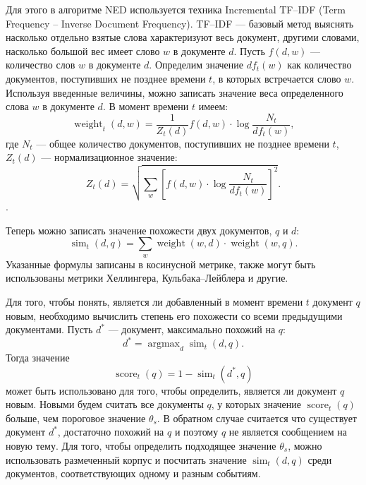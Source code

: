 \documentclass[12pt, a4paper]{article}
\DeclareMathOperator*{\argmax}{argmax}
\DeclareMathOperator{\weight}{weight}
\DeclareMathOperator{\score}{score}
\DeclareMathOperator{\simu}{sim}
\begin{document}
	Для этого в алгоритме NED используется техника Incremental TF--IDF (Term Frequency -- Inverse Document Frequency). TF--IDF --- базовый метод выяснять насколько отдельно взятые слова характеризуют весь документ, другими словами, насколько большой вес имеет слово $w$ в документе $d$. Пусть $f(d,w)$ --- количество слов $w$ в документе $d$. Определим значение $df_t(w)$ как количество документов, поступивших не позднее времени $t$, в которых встречается слово $w$. Используя введенные величины, можно записать значение веса определенного слова $w$ в документе $d$. В момент времени $t$ имеем:
	\begin{equation}
	\weight_t(d,w) = \frac{1}{Z_t(d)}f(d,w) \cdot \log \frac{N_t}{df_t(w)},
	\end{equation}
	где $N_t$ --- общее количество документов, поступивших не позднее времени $t$, $Z_t(d)$ --- нормализационное значение:
	\begin{equation}
	Z_t(d) = \sqrt{\sum_w \left[ f(d,w) \cdot \log \frac{N_t}{df_t(w)} \right]^2}.
	\end{equation}.
	
	Теперь можно записать значение похожести двух документов, $q$ и $d$:
	\begin{equation}
	\simu_t(d,q) = \sum_w \weight(w, d) \cdot \weight(w, q).
	\end{equation}
	Указанные формулы записаны в косинусной метрике, также могут быть использованы метрики Хеллингера, Кульбака--Лейблера и другие.
	
	Для того, чтобы понять, является ли добавленный в момент времени $t$ документ $q$ новым, необходимо вычислить степень его похожести со всеми предыдущими документами. Пусть $d^*$ --- документ, максимально похожий на $q$:
	\begin{equation}
	d^* = \argmax_d \simu_t (d,q).
	\end{equation}
	Тогда значение
	\begin{equation}
	\score_t(q) = 1 - \simu_t (d^*, q)
	\end{equation}
	может быть использовано для того, чтобы определить, является ли документ $q$ новым. Новыми будем считать все документы $q$, у которых значение $\score_t(q)$ больше, чем пороговое значение $\theta_s$. В обратном случае считается что существует документ $d^*$, достаточно похожий на $q$ и поэтому $q$ не является сообщением на новую тему. Для того, чтобы определить подходящее значение $\theta_s$, можно использовать размеченный корпус и посчитать значение $\simu_t (d,q)$ среди документов, соответствующих одному и разным событиям.
	
\end{document}
